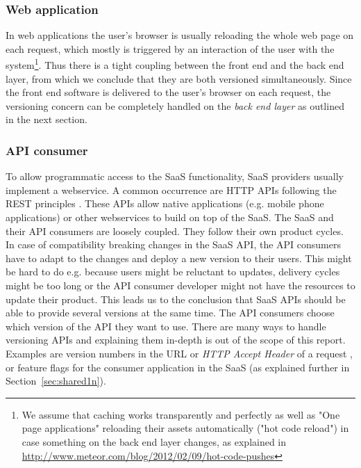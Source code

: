 \subsubsection{Web application} In web applications the user's browser is usually reloading the whole web page on each request, which mostly is triggered by an interaction of the user with the system\footnote{We assume that caching works transparently and perfectly as well as "One page applications" reloading their assets automatically ("hot code reload") in case something on the back end layer changes, as explained in \url{http://www.meteor.com/blog/2012/02/09/hot-code-pushes}}. Thus there is a tight coupling between the front end and the back end layer, from which we conclude that they are both versioned simultaneously. Since the front end software is delivered to the user's browser on each request, the versioning concern can be completely handled on the \emph{back end layer} as outlined in the next section.

\subsubsection{API consumer} To allow programmatic access to the SaaS functionality, SaaS providers usually implement a webservice. A common occurrence are HTTP APIs following the REST principles \cite{Fielding2000}. These APIs allow native applications (e.g. mobile phone applications) or other webservices to build on top of the SaaS. The SaaS and their API consumers are loosely coupled. They follow their own product cycles. In case of compatibility breaking changes in the SaaS API, the API consumers have to adapt to the changes and deploy a new version to their users. This might be hard to do e.g. because users might be reluctant to updates, delivery cycles might be too long or the API consumer developer might not have the resources to update their product. This leads us to the conclusion that SaaS APIs should be able to provide several versions at the same time. The API consumers choose which version of the API they want to use. There are many ways to handle versioning APIs and explaining them in-depth is out of the scope of this report. Examples are version numbers in the URL or \emph{HTTP Accept Header} of a request \cite{RFC2616}, or feature flags for the consumer application in the SaaS \cite{playbook2013} (as explained further in Section~\ref{sec:shared1n}).


